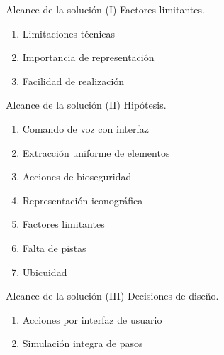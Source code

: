 
\begin{frame}{Alcance de la solución (I)}
	Factores limitantes.
	\begin{enumerate}[<+->]
	\item Limitaciones técnicas
	\item Importancia de representación
	\item Facilidad de realización
	\end{enumerate}
\end{frame}

\begin{frame}{Alcance de la solución (II)}
	Hipótesis.
	\begin{enumerate}[<+->]
	\item Comando de voz con interfaz
	\item Extracción uniforme de elementos
	\item Acciones de bioseguridad
	\item Representación iconográfica
	\item Factores limitantes
	\item Falta de pistas
	\item Ubicuidad
	\end{enumerate}
\end{frame}

\begin{frame}{Alcance de la solución (III)}
	Decisiones de diseño.
	\begin{enumerate}[<+->]
	\item Acciones por interfaz de usuario
	\item Simulación integra de pasos
	\end{enumerate}
\end{frame}
